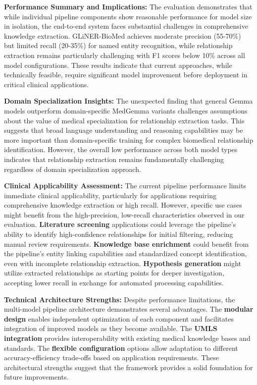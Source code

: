 \textbf{Performance Summary and Implications:} The evaluation demonstrates that while individual pipeline components show reasonable performance for model size in isolation, the end-to-end system faces substantial challenges in comprehensive knowledge extraction. GLiNER-BioMed achieves moderate precision (55-70\%) but limited recall (20-35\%) for named entity recognition, while relationship extraction remains particularly challenging with F1 scores below 10\% across all model configurations. These results indicate that current approaches, while technically feasible, require significant model improvement before deployment in critical clinical applications.

\textbf{Domain Specialization Insights:} The unexpected finding that general Gemma models outperform domain-specific MedGemma variants challenges assumptions about the value of medical specialization for relationship extraction tasks. This suggests that broad language understanding and reasoning capabilities may be more important than domain-specific training for complex biomedical relationship identification. However, the overall low performance across both model types indicates that relationship extraction remains fundamentally challenging regardless of domain specialization approach.

\textbf{Clinical Applicability Assessment:} The current pipeline performance limits immediate clinical applicability, particularly for applications requiring comprehensive knowledge extraction or high recall. However, specific use cases might benefit from the high-precision, low-recall characteristics observed in our evaluation. \textbf{Literature screening} applications could leverage the pipeline's ability to identify high-confidence relationships for initial filtering, reducing manual review requirements. \textbf{Knowledge base enrichment} could benefit from the pipeline's entity linking capabilities and standardized concept identification, even with incomplete relationship extraction. \textbf{Hypothesis generation} might utilize extracted relationships as starting points for deeper investigation, accepting lower recall in exchange for automated processing capabilities.

\textbf{Technical Architecture Strengths:} Despite performance limitations, the multi-model pipeline architecture demonstrates several advantages. The \textbf{modular design} enables independent optimization of each component and facilitates integration of improved models as they become available. The \textbf{UMLS integration} provides interoperability with existing medical knowledge bases and standards. The \textbf{flexible configuration} options allow adaptation to different accuracy-efficiency trade-offs based on application requirements. These architectural strengths suggest that the framework provides a solid foundation for future improvements.
